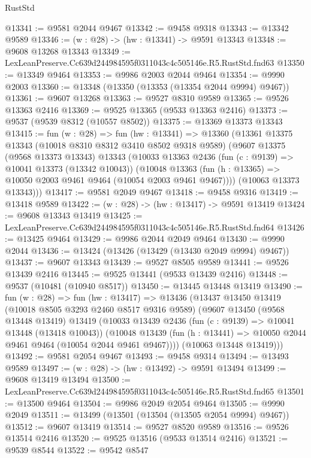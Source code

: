 \begin{lexlean}{RustStd}
\begin{coremodule}
@13341 := @9581 @2044 @9467
@13342 := @9458 @9318
@13343 := @13342 @9589
@13346 := (w : @28) -> (hw : @13341) -> @9591 @13343
@13348 := @9608 @13268 @13343
@13349 := LexLeanPreserve.Cc639d244984595f0311043c4c505146e.R5.RustStd.fnd63
@13350 := @13349 @9464
@13353 := @9986 @2003 @2044 @9464
@13354 := @9990 @2003
@13360 := @13348 (@13350 (@13353 (@13354 @2044 @9994) @9467))
@13361 := @9607 @13268
@13363 := @9527 @8310 @9589
@13365 := @9526 @13363 @2416
@13369 := @9525 @13365 (@9533 @13363 @2416)
@13373 := @9537 (@9539 @8312 (@10557 @8502))
@13375 := @13369 @13373 @13343
@13415 := fun (w : @28) =>
  fun (hw : @13341) =>
  @13360
    (@13361
      @13375
      @13343
      (@10018 @8310 @8312 @3410 @8502 @9318 @9589)
      (@9607
        @13375
        (@9568 @13373 @13343)
        @13343
        (@10033
          @13363
          @2436
          (fun (c : @9139) => @10041 @13373 (@13342 @10043))
          (@10048 @13363 (fun (h : @13365) => @10050 @2003 @9461 @9464 (@10054 @2003 @9461 @9467))))
        (@10063 @13373 @13343)))
@13417 := @9581 @2049 @9467
@13418 := @9458 @9316
@13419 := @13418 @9589
@13422 := (w : @28) -> (hw : @13417) -> @9591 @13419
@13424 := @9608 @13343 @13419
@13425 := LexLeanPreserve.Cc639d244984595f0311043c4c505146e.R5.RustStd.fnd64
@13426 := @13425 @9464
@13429 := @9986 @2044 @2049 @9464
@13430 := @9990 @2044
@13436 := @13424 (@13426 (@13429 (@13430 @2049 @9994) @9467))
@13437 := @9607 @13343
@13439 := @9527 @8505 @9589
@13441 := @9526 @13439 @2416
@13445 := @9525 @13441 (@9533 @13439 @2416)
@13448 := @9537 (@10481 (@10940 @8517))
@13450 := @13445 @13448 @13419
@13490 := fun (w : @28) =>
  fun (hw : @13417) =>
  @13436
    (@13437
      @13450
      @13419
      (@10018 @8505 @3293 @2460 @8517 @9316 @9589)
      (@9607
        @13450
        (@9568 @13448 @13419)
        @13419
        (@10033
          @13439
          @2436
          (fun (c : @9139) => @10041 @13448 (@13418 @10043))
          (@10048 @13439 (fun (h : @13441) => @10050 @2044 @9461 @9464 (@10054 @2044 @9461 @9467))))
        (@10063 @13448 @13419)))
@13492 := @9581 @2054 @9467
@13493 := @9458 @9314
@13494 := @13493 @9589
@13497 := (w : @28) -> (hw : @13492) -> @9591 @13494
@13499 := @9608 @13419 @13494
@13500 := LexLeanPreserve.Cc639d244984595f0311043c4c505146e.R5.RustStd.fnd65
@13501 := @13500 @9464
@13504 := @9986 @2049 @2054 @9464
@13505 := @9990 @2049
@13511 := @13499 (@13501 (@13504 (@13505 @2054 @9994) @9467))
@13512 := @9607 @13419
@13514 := @9527 @8520 @9589
@13516 := @9526 @13514 @2416
@13520 := @9525 @13516 (@9533 @13514 @2416)
@13521 := @9539 @8544
@13522 := @9542 @8547

\end{coremodule}
\end{lexlean}
